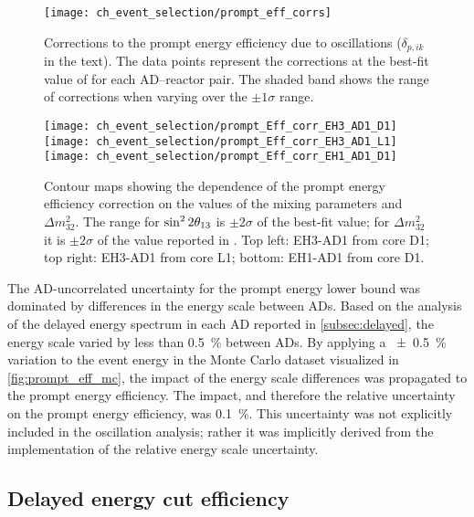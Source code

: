 \begin{figure}
    \centering
    \texttt{[image: ch\_event\_selection/prompt\_eff\_corrs]}
    \caption[Prompt efficiency corrections due to oscillation effects]{
        Corrections to the prompt energy efficiency due to \nuebar{} oscillations
        ($\delta_{p,ik}$ in the text).
        The data points represent the corrections at the best-fit
        value of \thetaot{} for each AD--reactor pair.
        The shaded band shows the range of corrections when varying \thetaot{}
        over the $\pm1\sigma$ range.
    }
    \label{fig:prompt_eff_osc}
\end{figure}

\begin{figure}
    \centering
    \texttt{[image: ch\_event\_selection/prompt\_Eff\_corr\_EH3\_AD1\_D1]}
    \texttt{[image: ch\_event\_selection/prompt\_Eff\_corr\_EH3\_AD1\_L1]}
    \\
    \texttt{[image: ch\_event\_selection/prompt\_Eff\_corr\_EH1\_AD1\_D1]}
    \caption[Prompt efficiency correction contour maps]{
        Contour maps showing the dependence of the prompt energy efficiency correction
        on the values of the mixing parameters \thetaot{} and $\Delta m^2_{32}$.
        The range for $\sin^22\theta_{13}{}$ is $\pm2\sigma$ of the best-fit value;
        for $\Delta m^2_{32}$ it is $\pm2\sigma$ of the value reported in \cite{ngd2018}.
        Top left: EH3-AD1 from core D1;
        top right: EH3-AD1 from core L1;
        bottom: EH1-AD1 from core D1.
    }
    \label{fig:prompt_eff_osc_contour}
\end{figure}

The AD-uncorrelated uncertainty for the prompt energy lower bound
was dominated by differences in the energy scale between ADs.
Based on the analysis of the delayed energy spectrum in each AD
reported in \cref{subsec:delayed}, the energy scale
varied by less than \SI{0.5}{\percent} between ADs.
By applying a \SI{+-0.5}{\percent} variation to
the event energy in the Monte Carlo dataset visualized in \cref{fig:prompt_eff_mc},
the impact of the energy scale differences was propagated
to the prompt energy efficiency.
The impact, and therefore the relative uncertainty on
the prompt energy efficiency, was \SI{0.1}{\percent}.
This uncertainty was not explicitly included in the
oscillation analysis;
rather it was implicitly derived from the
implementation of the relative energy scale uncertainty.

\subsection{Delayed energy cut efficiency}
\label{subsec:eff_delayed}

